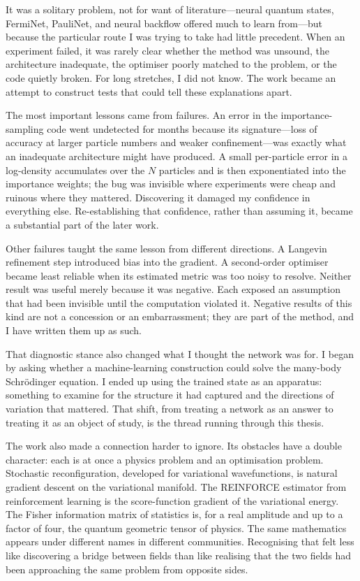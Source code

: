 \begin{flushleft}
It was a solitary problem, not for want of literature---neural quantum states,
FermiNet, PauliNet, and neural backflow offered much to learn from---but because
the particular route I was trying to take had little precedent. When an
experiment failed, it was rarely clear whether the method was unsound, the
architecture inadequate, the optimiser poorly matched to the problem, or the
code quietly broken. For long stretches, I did not know. The work became an attempt to construct tests that could tell these
explanations apart.

The most important lessons came from failures. An error in the
importance-sampling code went undetected for months because its signature---loss
of accuracy at larger particle numbers and weaker confinement---was exactly what
an inadequate architecture might have produced. A small per-particle error in a log-density
accumulates over the $N$ particles and is then exponentiated into the importance
weights; the bug was invisible where experiments were cheap and
ruinous where they mattered. Discovering it damaged my confidence in everything
else. Re-establishing that confidence, rather than assuming it, became a
substantial part of the later work.

Other failures taught the same lesson from different directions. A Langevin
refinement step introduced bias into the gradient. A second-order optimiser
became least reliable when its estimated metric was too noisy to resolve.
Neither result was useful merely because it was negative. Each exposed an
assumption that had been invisible until the computation violated it. Negative
results of this kind are not a concession or an embarrassment; they are part of
the method, and I have written them up as such.

That diagnostic stance also changed what I thought the network was for. I began
by asking whether a machine-learning construction could solve the many-body
Schr\"odinger equation. I ended up using the trained state as an apparatus:
something to examine for the structure it had captured and the directions of
variation that mattered. That shift, from treating a network as an answer to
treating it as an object of study, is the thread running through this thesis.

The work also made a connection harder to ignore. Its obstacles have a double
character: each is at once a physics problem and an optimisation problem.
Stochastic reconfiguration, developed for variational wavefunctions, is natural
gradient descent on the variational manifold. The REINFORCE estimator from
reinforcement learning is the score-function gradient of the variational energy.
The Fisher information matrix of statistics is, for a real amplitude and up to a
factor of four, the quantum geometric tensor of physics. The same mathematics appears under different names in different
communities. Recognising that felt less like discovering a bridge between fields
than like realising that the two fields had been approaching the same problem
from opposite sides.


\end{flushleft}
